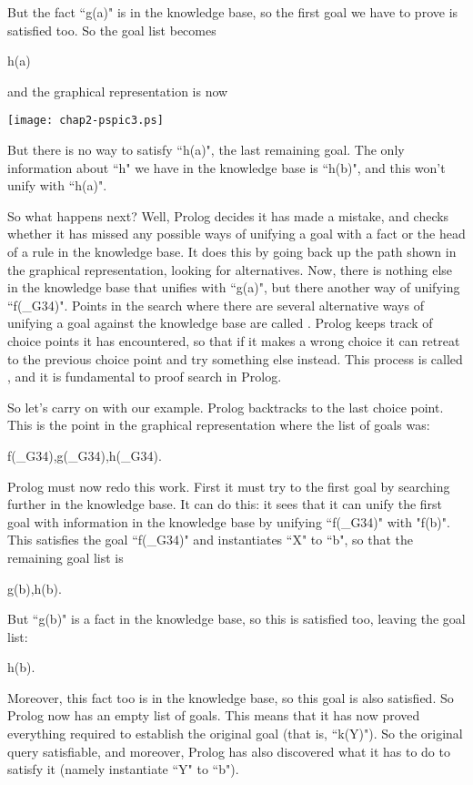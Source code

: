 But the fact ``g(a)" is in the knowledge base, so the first goal we
have to prove is satisfied too. So the goal list becomes
\begin{LPNcodedisplay}
h(a)
\end{LPNcodedisplay}
%
and the graphical representation is now
%
\begin{center}
\texttt{[image: chap2-pspic3.ps]}
\end{center}
%
But there is no way to satisfy ``h(a)", the last remaining goal.  The
only information about ``h" we have in the knowledge base is ``h(b)",
and this won't unify with ``h(a)".

So what happens next? Well, Prolog decides it has made a mistake, and
checks whether it has missed any possible ways of unifying a goal with
a fact or the head of a rule in the knowledge base. It does this by
going back up the path shown in the graphical representation, looking
for alternatives. Now, there is nothing else in the knowledge base
that unifies with ``g(a)", but there  another way of
unifying ``f(\_G34)".  Points in the search where there are several
alternative ways of unifying a goal against the knowledge base are
called .  Prolog keeps track of choice points it
has encountered, so that if it makes a wrong choice it can retreat to
the previous choice point and try something else instead. This process
is called , and it is fundamental to proof search
in Prolog.

So let's carry on with our example.
Prolog backtracks to the last choice point. This is the
point in the graphical representation where the list of goals was:
\begin{LPNcodedisplay}
f(_G34),g(_G34),h(_G34).
\end{LPNcodedisplay}
Prolog must now redo this work.  First it must try to
 the first goal  by searching further in the
knowledge base.  It can do this: it sees that it can unify the first
goal with information in the knowledge base by unifying ``f(\_G34)" with
"f(b)". This satisfies the goal ``f(\_G34)" and instantiates ``X" to ``b",
so that the remaining goal list is
\begin{LPNcodedisplay}
g(b),h(b).
\end{LPNcodedisplay}
But ``g(b)" is a fact in the knowledge base, so this is satisfied too,
leaving the goal list:
\begin{LPNcodedisplay}
h(b).
\end{LPNcodedisplay}
Moreover, this fact too is in the knowledge base, so this goal is also
satisfied. So Prolog now has an empty list of goals.  This means that
it has now proved everything required to establish the original goal
(that is, ``k(Y)"). So the original query  satisfiable, and
moreover, Prolog has also discovered what it has to do to satisfy it
(namely instantiate ``Y" to ``b").


